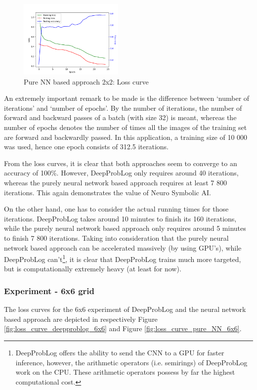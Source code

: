 \documentclass[english]{sobraep}
\begin{document}
\begin{figure}[htp]
    \begin{center}
    \includegraphics[width=0.45\textwidth]{loss_curve_pure_NN_2x2.png} 
    \captionsetup{justification=centering}
    \caption{Pure NN based approach 2x2: Loss curve}
    \label{fig:loss_curve_pure_NN_2x2}
    \end{center}
\end{figure}
An extremely important remark to be made is the difference between `number of iterations' and `number of epochs'. By the number of iterations, the number of forward and backward passes of a batch (with size 32) is meant, whereas the number of epochs denotes the number of times all the images of the training set are forward and backwardly passed. In this application, a training size of 10 000 was used, hence one epoch consists of 312.5 iterations.

From the loss curves, it is clear that both approaches seem to converge to an accuracy of 100\%. However, DeepProbLog only requires around 40 iterations, whereas the purely neural network based approach requires at least 7 800 iterations. This again demonstrates the value of Neuro Symbolic AI.

On the other hand, one has to consider the actual running times for those iterations. DeepProbLog takes around 10 minutes to finish its 160 iterations, while the purely neural network based approach only requires around 5 minutes to finish 7 800 iterations. Taking into consideration that the purely neural network based approach can be accelerated massively (by using GPU's), while DeepProbLog can't\footnote{DeepProbLog offers the ability to send the CNN to a GPU for faster inference, however, the arithmetic operators (i.e. semirings) of DeepProbLog work on the CPU. These arithmetic operators possess by far the highest computational cost.}, it is clear that DeepProbLog trains much more targeted, but is computationally extremely heavy (at least for now).

\subsubsection{Experiment - 6x6 grid}
The loss curves for the 6x6 experiment of DeepProbLog and the neural network based approach are depicted in respectively Figure \ref{fig:loss_curve_deepproblog_6x6} and Figure \ref{fig:loss_curve_pure_NN_6x6}.
\end{document}
